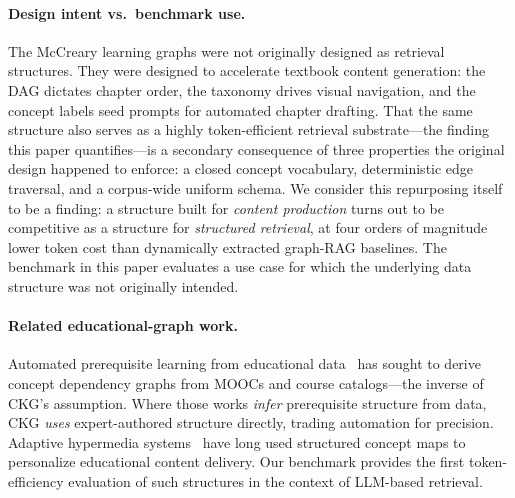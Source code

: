 \paragraph{Design intent vs.\ benchmark use.}
The McCreary learning graphs were not originally designed as retrieval
structures. They were designed to accelerate textbook content generation:
the DAG dictates chapter order, the taxonomy drives visual navigation,
and the concept labels seed prompts for automated chapter drafting. That
the same structure also serves as a highly token-efficient retrieval
substrate---the finding this paper quantifies---is a secondary consequence
of three properties the original design happened to enforce: a closed
concept vocabulary, deterministic edge traversal, and a corpus-wide
uniform schema. We consider this repurposing itself to be a finding: a
structure built for \emph{content production} turns out to be
competitive as a structure for \emph{structured retrieval}, at four
orders of magnitude lower token cost than dynamically extracted
graph-RAG baselines. The benchmark in this paper evaluates a use case
for which the underlying data structure was not originally intended.

\paragraph{Related educational-graph work.}
Automated prerequisite learning from educational data~\cite{liu2016mooc,
shen2018kdd} has sought to derive concept dependency graphs from MOOCs
and course catalogs---the inverse of CKG's assumption. Where those works
\emph{infer} prerequisite structure from data, CKG \emph{uses}
expert-authored structure directly, trading automation for precision.
Adaptive hypermedia systems~\cite{brusilovsky2001adaptive} have long used
structured concept maps to personalize educational content delivery.
Our benchmark provides the first token-efficiency evaluation of such
structures in the context of LLM-based retrieval.
